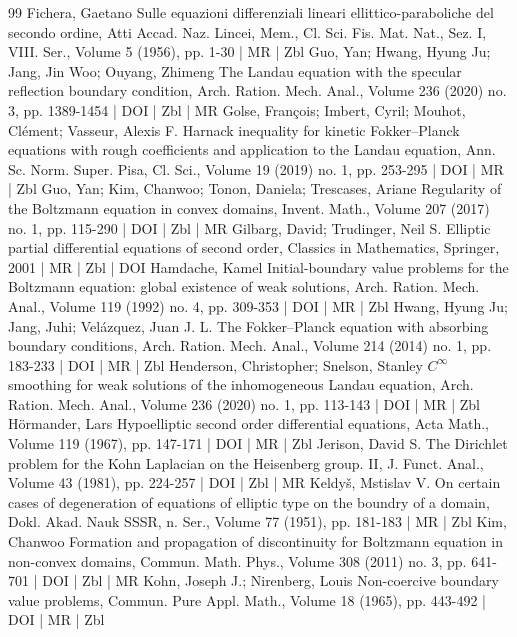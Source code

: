 \begin{thebibliography}{99}
 Fichera, Gaetano Sulle equazioni differenziali lineari ellittico-paraboliche del secondo ordine, Atti Accad. Naz. Lincei, Mem., Cl. Sci. Fis. Mat. Nat., Sez. I, VIII. Ser., Volume 5 (1956), pp. 1-30 | MR | Zbl
 Guo, Yan; Hwang, Hyung Ju; Jang, Jin Woo; Ouyang, Zhimeng The Landau equation with the specular reflection boundary condition, Arch. Ration. Mech. Anal., Volume 236 (2020) no. 3, pp. 1389-1454 | DOI | Zbl | MR
 Golse, François; Imbert, Cyril; Mouhot, Clément; Vasseur, Alexis F. Harnack inequality for kinetic Fokker–Planck equations with rough coefficients and application to the Landau equation, Ann. Sc. Norm. Super. Pisa, Cl. Sci., Volume 19 (2019) no. 1, pp. 253-295 | DOI | MR | Zbl
 Guo, Yan; Kim, Chanwoo; Tonon, Daniela; Trescases, Ariane Regularity of the Boltzmann equation in convex domains, Invent. Math., Volume 207 (2017) no. 1, pp. 115-290 | DOI | Zbl | MR
 Gilbarg, David; Trudinger, Neil S. Elliptic partial differential equations of second order, Classics in Mathematics, Springer, 2001 | MR | Zbl | DOI
 Hamdache, Kamel Initial-boundary value problems for the Boltzmann equation: global existence of weak solutions, Arch. Ration. Mech. Anal., Volume 119 (1992) no. 4, pp. 309-353 | DOI | MR | Zbl
 Hwang, Hyung Ju; Jang, Juhi; Velázquez, Juan J. L. The Fokker–Planck equation with absorbing boundary conditions, Arch. Ration. Mech. Anal., Volume 214 (2014) no. 1, pp. 183-233 | DOI | MR | Zbl
 Henderson, Christopher; Snelson, Stanley ${C}^\infty $ smoothing for weak solutions of the inhomogeneous Landau equation, Arch. Ration. Mech. Anal., Volume 236 (2020) no. 1, pp. 113-143 | DOI | MR | Zbl
 Hörmander, Lars Hypoelliptic second order differential equations, Acta Math., Volume 119 (1967), pp. 147-171 | DOI | MR | Zbl
 Jerison, David S. The Dirichlet problem for the Kohn Laplacian on the Heisenberg group. II, J. Funct. Anal., Volume 43 (1981), pp. 224-257 | DOI | Zbl | MR
 Keldyš, Mstislav V. On certain cases of degeneration of equations of elliptic type on the boundry of a domain, Dokl. Akad. Nauk SSSR, n. Ser., Volume 77 (1951), pp. 181-183 | MR | Zbl
 Kim, Chanwoo Formation and propagation of discontinuity for Boltzmann equation in non-convex domains, Commun. Math. Phys., Volume 308 (2011) no. 3, pp. 641-701 | DOI | Zbl | MR
 Kohn, Joseph J.; Nirenberg, Louis Non-coercive boundary value problems, Commun. Pure Appl. Math., Volume 18 (1965), pp. 443-492 | DOI | MR | Zbl

\end{thebibliography}
